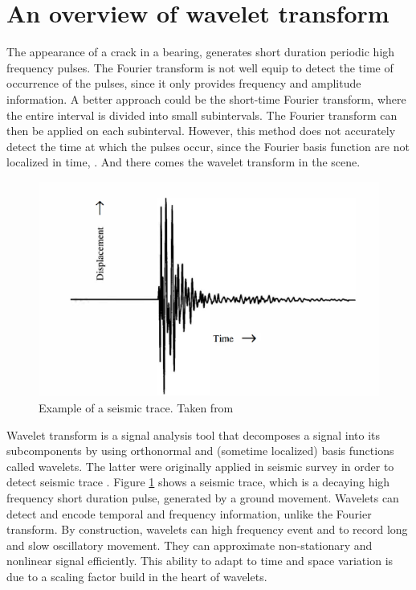 \documentclass[../Main/thesis.tex]{subfiles}
\begin{document}
\section{An overview of wavelet transform}
\label{sec:wavelet}
The appearance of a crack in a bearing, generates short duration periodic high frequency pulses. The Fourier transform is not well equip to detect the time of occurrence of the pulses, since it only provides frequency and amplitude information. A better approach could be the short-time Fourier transform, where the entire interval is divided into small subintervals. The Fourier transform can then be applied on each subinterval. However, this method does not accurately detect the time at which the pulses occur, since the Fourier basis function are not localized in time, \cite{albert09}. And there comes the wavelet transform in the scene.  
\begin{figure}[H] %
   \centering
   \includegraphics[width=4.5in]{../fig/seismicwave.png} 
   \caption{Example of a seismic trace. Taken from \cite{albert09}}
   \label{fig:seismicwave}
\end{figure}
\justify
Wavelet transform is a signal analysis tool that decomposes a signal into its subcomponents by using orthonormal and (sometime localized) basis functions called wavelets. The latter were originally applied in seismic survey in order to detect seismic trace \cite{albert09}. Figure \ref{fig:seismicwave} shows a seismic trace, which is a decaying high frequency short duration pulse, generated by a ground movement. Wavelets can detect and encode temporal and frequency information, unlike the Fourier transform. By construction, wavelets can  high frequency event and  to record long and slow oscillatory movement. They can approximate non-stationary and nonlinear signal efficiently. This ability to adapt to time and space variation is due to a scaling factor build in the heart of wavelets.
\end{document}
